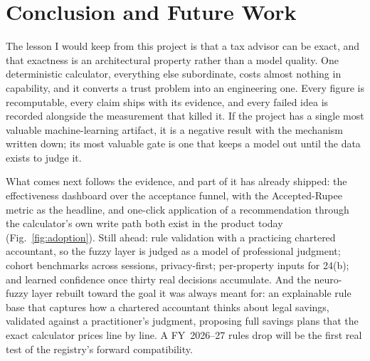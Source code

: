 \documentclass[conference]{IEEEtran}
\begin{document}
\section{Conclusion and Future Work}
The lesson I would keep from this project is that a tax advisor can be
exact, and that exactness is an architectural property rather than a
model quality. One deterministic calculator, everything else
subordinate, costs almost nothing in capability, and it converts a
trust problem into an engineering one. Every figure is recomputable,
every claim ships with its evidence, and every failed idea is recorded
alongside the measurement that killed it. If the project has a single
most valuable machine-learning artifact, it is a negative result with
the mechanism written down; its most valuable gate is one that keeps a
model out until the data exists to judge it.

What comes next follows the evidence, and part of it has already
shipped: the effectiveness dashboard over the acceptance funnel, with
the Accepted-Rupee metric as the headline, and one-click application
of a recommendation through the calculator's own write path both exist
in the product today (Fig.~\ref{fig:adoption}). Still ahead: rule
validation with a practicing chartered accountant, so the fuzzy layer
is judged as a model of professional judgment; cohort benchmarks
across sessions, privacy-first; per-property inputs for 24(b); and
learned confidence once thirty real decisions accumulate. And the
neuro-fuzzy layer rebuilt toward the goal it was
always meant for: an explainable rule base that captures how a
chartered accountant thinks about legal savings, validated against a
practitioner's judgment, proposing full savings plans that the exact
calculator prices line by line. A FY~2026--27 rules drop will be the
first real test of the registry's forward compatibility.
\end{document}
